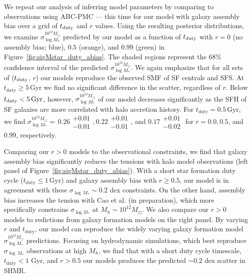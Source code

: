 \documentclass[12pt, letterpaper, preprint, tighten]{aastex62}
\newcommand{\edt}[1]{{\color{dred}{\bf} #1}}
\newcommand{\siglogm}{\sigma_{\log M_*}}
\begin{document}
We repeat our analysis of inferring model parameters by comparing to observations
using ABC-PMC --- this time for our model with galaxy assembly bias over a grid of
$t_{\rm duty}$ and $r$ values. Using the resulting posterior distributions, we
examine $\siglogm^{10^{12}M_\odot}$ predicted by our model as a
function of $t_{\rm duty}$ with $r=0$ (no assembly bias; blue), $0.5$ (orange),
and $0.99$ (green) in Figure~\ref{fig:sigMstar_duty_abias}. The shaded regions
represent the $68\%$ confidence interval of the predicted $\siglogm^{10^{12}M_\odot}$.
We again emphasize that for all sets of ($t_{\rm duty}$, $r$) our models reproduce
the observed SMF of SF centrals and SFS.  At $t_\mathrm{duty} \geq 5\,\mathrm{Gyr}$
we find no significant difference in the scatter, regardless of $r$.
Below $t_{\rm duty} < 5\,\mathrm{Gyr}$, however, $\siglogm^{10^{12}M_\odot}$ of our
model decreases significantly as the SFH of SF galaxies are more correlated
with halo accretion history.  For $t_\mathrm{duty} = 0.5\,\mathrm{Gyr}$, we find
$\siglogm^{10^{12}M_\odot}{=}\,0.26\substack{+0.01\\-0.01},
0.22\substack{+0.01\\-0.01}$, and $0.17\substack{+0.01\\-0.02} $
for $r = 0.0, 0.5$, and $0.99$, respectively.

\edt{Comparing our $r > 0$ models to the observational constraints, we find that 
galaxy assembly bias significantly reduces the tensions with halo model observations 
(left panel of Figure~\ref{fig:sigMstar_duty_abias})}.
With a short star formation duty cycle ($t_\mathrm{duty} \leq 1\,\mathrm{Gyr}$)
and galaxy assembly bias with $r \ge 0.5$, our model is in agreement with
these $\sigma_{\log\,M_*} \sim 0.2$ dex constraints. On the other hand,
assembly bias increases the tension with
\edt{Cao et al. (in preparation), which more specifically constrains $\siglogm$ 
at $M_h\sim 10^{12}M_\odot$. We also compare our $r > 0$ models to
redictions from galaxy formation models on the right panel.}
By varying $r$ and $t_\mathrm{duty}$, our model can reproduce the widely varying 
galaxy formation model $\siglogm^{10^{12}M_\odot}$ predictions.
\edt{Focusing on hydrodynamic simulations, which best reproduce $\sigma_{\log\,M_*}$
observations at high $M_h$, we find that with a short duty cycle timescale,
$t_\mathrm{duty} < 1$ Gyr, and $r > 0.5$ our models produces the predicted 
$\sim0.2$ dex scatter in SHMR.}
\end{document}
